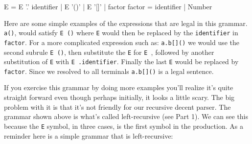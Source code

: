 

\begin{lcverbatim}
E       = E '.' identifier
        | E '()'
        | E '[]'
        | factor
factor  = identifier
        | Number
\end{lcverbatim}

Here are some simple examples of the expressions that are legal in this grammar. {\tt a()}, would satisfy {\tt E \textquotesingle()\textquotesingle} where {\tt E} would then be replaced by the {\tt identifier} in {\tt factor}. For a more complicated expression such as: {\tt a.b[]()} we would use the second subrule {\tt E \textquotesingle()\textquotesingle}, then substitute the {\tt E} for {\tt E \textquotesingle[]\textquotesingle}, followed by another substitution of {\tt E} with {\tt E \textquotesingle.\textquotesingle identifier}. Finally the last {\tt E} would be replaced by {\tt factor}. Since we resolved to all terminals {\tt a.b[]()} is a legal sentence.

If you exercise this grammar by doing more examples you'll realize it's quite straight forward even though perhaps initially, it looks a little scary.  The big problem with it is that it's not friendly for our recursive decent parser. The grammar shown above is what's called left-recursive (see Part 1). We can see this because the {\tt E} symbol, in three cases, is the first symbol in the production.  As a reminder here is a simple grammar that is left-recursive:

